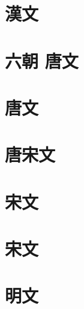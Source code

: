 \documentclass[openany,a5paper]{utbook}
\begin{document}
\chapter[{\small 漢文}]{漢文}


\chapter[{\small 六朝 唐文}]{六朝 唐文}


\chapter[{\small 唐文}]{唐文}


\chapter[{\small 唐宋文}]{唐宋文}


\chapter[{\small 宋文}]{宋文}


\chapter[{\small 宋文}]{宋文}


\chapter[{\small 明文}]{明文}

\end{document}
